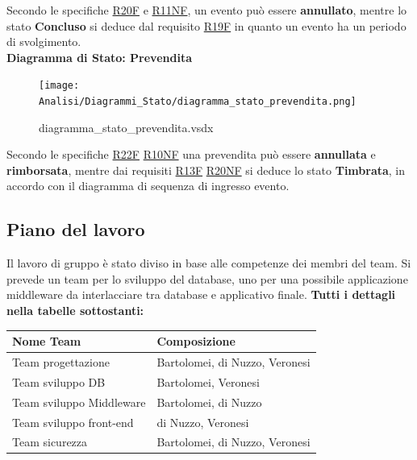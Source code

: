 \documentclass[a4paper]{article}
\begin{document}
Secondo le specifiche \hyperlink{R20F}{R20F} e \hyperlink{R11NF}{R11NF}, un evento può essere \textbf{annullato}, mentre lo stato \textbf{Concluso} si deduce dal requisito \hyperlink{R19F}{R19F} in quanto un evento ha un periodo di svolgimento.\\

\textbf{Diagramma di Stato: Prevendita}

\begin{figure}[H]
    \texttt{[image: Analisi/Diagrammi\_Stato/diagramma\_stato\_prevendita.png]}
    \centering
    \caption{diagramma\_stato\_prevendita.vsdx}
\end{figure}

Secondo le specifiche \hyperlink{R22F}{R22F} \hyperlink{R10NF}{R10NF} una prevendita può essere \textbf{annullata} e \textbf{rimborsata}, mentre dai requisiti \hyperlink{R13F}{R13F} \hyperlink{R20NF}{R20NF} si deduce lo stato \textbf{Timbrata}, in accordo con il diagramma di sequenza di ingresso evento.

\newpage

\subsection{Piano del lavoro}

Il lavoro di gruppo è stato diviso in base alle competenze dei membri del team. Si prevede un team per lo sviluppo del database, uno per una possibile applicazione middleware da interlacciare tra database e applicativo finale. \textbf{Tutti i dettagli nella tabelle sottostanti:}

\begin{center}
    \begin{tabularx}{1\textwidth}{|X|X|}
        \hline
        \textbf{Nome Team} & \textbf{Composizione}\\
        \hline
        \hline
        Team progettazione & Bartolomei, di Nuzzo, Veronesi\\
        \hline
        Team sviluppo DB & Bartolomei, Veronesi\\
        \hline
        Team sviluppo Middleware & Bartolomei, di Nuzzo\\
        \hline
        Team sviluppo front-end & di Nuzzo, Veronesi\\
        \hline
        Team sicurezza & Bartolomei, di Nuzzo, Veronesi\\
        \hline
    \end{tabularx}
\end{center}
\end{document}
